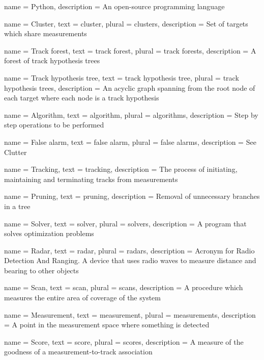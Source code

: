 {
	name 		= Python,
	description = {An open-source programming language}
}

{
	name 		= Cluster,
	text 		= cluster,
	plural 		= clusters,
	description = {Set of \glspl{target} which share \glspl{measurement}}
}

{
	name 		= {Track forest},
	text 		= {track forest},
	plural 		= {track forests},
	description = {A forest of track hypothesis trees}
}

{
	name 		= {Track hypothesis tree},
	text 		= {track hypothesis tree},
	plural 		= {track hypothesis trees},
	description = {An acyclic graph spanning from the root node of each target where each node is a track hypothesis}
}

{
	name 		= Algorithm,
	text 		= algorithm,
	plural 		= algorithms,
	description = {Step by step operations to be performed}
}

{
	name 		= {False alarm},
	text 		= {false alarm},
	plural 		= {false alarms},
	description = {See Clutter}
}

{
	name 		= Tracking,
	text 		= tracking,
	description = {The process of initiating, maintaining and terminating tracks from measurements}
}

{
	name 		= Pruning,
	text 		= pruning,
	description = {Removal of unnecessary branches in a tree}
}

{
	name 		= Solver,
	text 		= solver,
	plural 		= solvers,
	description = {A program that solves optimization problems}
}

{
	name 		= Radar,
	text 		= radar,
	plural 		= radars,
	description = {Acronym for Radio Detection And Ranging. A device that uses radio waves to measure distance and bearing to other objects}
}

{
	name 		= Scan,
	text		= scan,
	plural 		= scans,
	description = {A procedure which measures the entire area of coverage of the system}
}

{
	name 		= Measurement,
	text 		= measurement,
	plural 		= measurements,
	description = {A point in the measurement space where something is detected}
}

{
	name 		= Score,
	text 		= score,
	plural		= scores,
	description = {A measure of the goodness of a measurement-to-track association}
}

